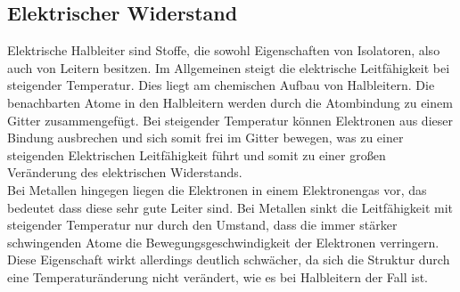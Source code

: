 \subsection{Elektrischer Widerstand}
Elektrische Halbleiter sind Stoffe, die sowohl Eigenschaften von Isolatoren, also auch von Leitern besitzen. Im Allgemeinen steigt die elektrische Leitfähigkeit bei steigender Temperatur. Dies liegt am chemischen Aufbau von Halbleitern. Die benachbarten Atome in den Halbleitern werden durch die Atombindung zu einem Gitter zusammengefügt. Bei steigender Temperatur können Elektronen aus dieser Bindung ausbrechen und sich somit frei im Gitter bewegen, was zu einer steigenden Elektrischen Leitfähigkeit führt und somit zu einer großen Veränderung des elektrischen Widerstands.\\
Bei Metallen hingegen liegen die Elektronen in einem Elektronengas vor, das bedeutet dass diese sehr gute Leiter sind. Bei Metallen sinkt die Leitfähigkeit mit steigender Temperatur nur durch den Umstand, dass die immer stärker schwingenden Atome die Bewegungsgeschwindigkeit der Elektronen verringern. Diese Eigenschaft wirkt allerdings deutlich schwächer, da sich die Struktur durch eine Temperaturänderung nicht verändert, wie es bei Halbleitern der Fall ist.









